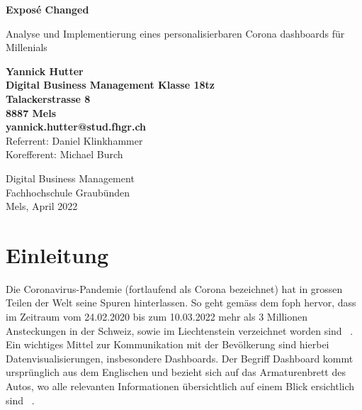 \documentclass[12pt, oneside]{article}
\begin{document}
\begin{titlepage}
	\begin{center}
		\Huge
		\textbf{Exposé Changed}
		
		\vspace{0.5cm}
		\LARGE
		Analyse und Implementierung eines personalisierbaren Corona dashboards für Millenials
		
		\vspace{1.5cm}
		\normalsize
		\textbf{Yannick Hutter}\\
		\textbf{Digital Business Management Klasse 18tz}\\
		\textbf{Talackerstrasse 8}\\
		\textbf{8887 Mels}\\
		\textbf{yannick.hutter@stud.fhgr.ch}\\

		
		\vfill
		Referrent: Daniel Klinkhammer\\
		Korefferent: Michael Burch\\
		
		\vspace{0.8cm}
		
		
		Digital Business Management\\
		Fachhochschule Graubünden\\
		Mels, April 2022
	\end{center}
\end{titlepage}



\tableofcontents
\listoffigures
\listoftables

\clearpage
\printglossaries



\clearpage
{}
\setcounter{page}{3}

\section{Einleitung}
Die Coronavirus-Pandemie (fortlaufend als Corona bezeichnet) hat in grossen Teilen der Welt seine Spuren hinterlassen. So geht gemäss dem \Gls{foph} hervor, dass im Zeitraum vom 24.02.2020 bis zum 10.03.2022 mehr als 3 Millionen Ansteckungen in der Schweiz, sowie im Liechtenstein verzeichnet worden sind ~\citep{FOPH.13.03.2022}. Ein wichtiges Mittel zur Kommunikation mit der Bevölkerung sind hierbei Datenvisualisierungen, insbesondere Dashboards.
Der Begriff Dashboard kommt ursprünglich aus dem Englischen und bezieht sich auf das Armaturenbrett des Autos, wo alle relevanten Informationen übersichtlich auf einem Blick ersichtlich sind ~\citep{Duden.18.04.2022}.\\
\end{document}

